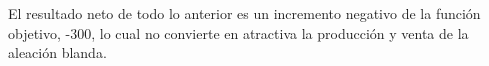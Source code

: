 \begin{enumerate}
El resultado neto de todo lo anterior es un incremento negativo de la función objetivo, -300, lo cual no convierte en atractiva la producción y venta de la aleación blanda.


\end{enumerate}








